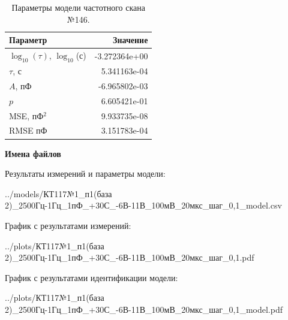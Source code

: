 \begin{table}[!ht]
    \centering
    \caption{Параметры модели частотного скана №146.}
    \begin{tabular}{|l|r|}
        \hline
        Параметр                                       & Значение                  \\ \hline
        $\log_{10}(\tau)$, $\log_{10}$(с)              & -3.272364e+00             \\ \hline
        $\tau$, с                                      & 5.341163e-04              \\ \hline
        $A$, пФ                                        & -6.965802e-03             \\ \hline
        $p$                                            & 6.605421e-01              \\ \hline
        MSE, пФ$^2$                                    & 9.933735e-08              \\ \hline
        RMSE пФ                                        & 3.151783e-04              \\ \hline
    \end{tabular}
    \label{table:frequency_scan_model_146}
\end{table}

\textbf{Имена файлов}

Результаты измерений и параметры модели:

\scriptsize../models/КТ117№1\_п1(база 2)\_2500Гц-1Гц\_1пФ\_+30С\_-6В-11В\_100мВ\_20мкс\_шаг\_0,1\_model.csv
\normalsize

График с результатами измерений:

\scriptsize../plots/КТ117№1\_п1(база 2)\_2500Гц-1Гц\_1пФ\_+30С\_-6В-11В\_100мВ\_20мкс\_шаг\_0,1.pdf
\normalsize

График с результатами идентификации модели:

\scriptsize../plots/КТ117№1\_п1(база 2)\_2500Гц-1Гц\_1пФ\_+30С\_-6В-11В\_100мВ\_20мкс\_шаг\_0,1\_model.pdf
\normalsize

